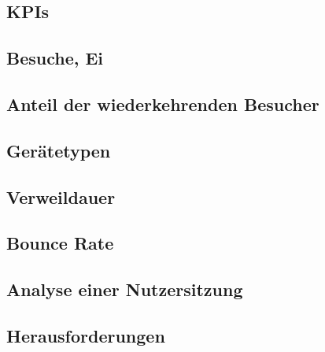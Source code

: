 \subsection{KPIs}

\subsection{Besuche, Ei}

\subsection{Anteil der wiederkehrenden Besucher}

\subsection{Gerätetypen}

\subsection{Verweildauer}

\subsection{Bounce Rate}

\subsection{Analyse einer Nutzersitzung}

\subsection{Herausforderungen}